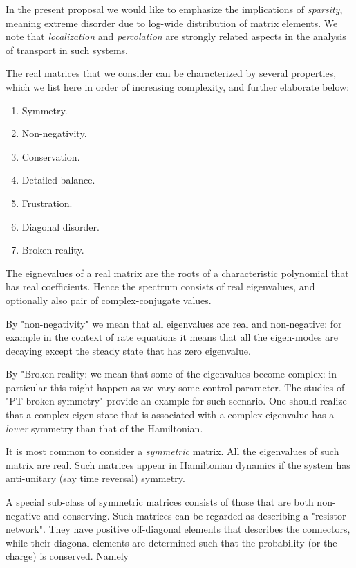 In the present proposal we would like to emphasize the 
implications of {\em sparsity}, meaning extreme disorder 
due to log-wide distribution of matrix elements. 
We note that {\em localization} and {\em percolation} are strongly 
related aspects in the analysis of transport in such systems. 


The real matrices that we consider can be characterized 
by several properties, which we list here in order of increasing 
complexity, and further elaborate below:

\begin{enumerate}
\item Symmetry.
\item Non-negativity.
\item Conservation.
\item Detailed balance.
\item Frustration.
\item Diagonal disorder.
\item Broken reality.
\end{enumerate}

The eignevalues of a real matrix are the roots of a characteristic 
polynomial that has real coefficients. Hence the spectrum consists 
of real eigenvalues, and optionally also pair of complex-conjugate 
values. 

By "non-negativity" we mean that all eigenvalues are real and 
non-negative: for example in the context of rate equations it means 
that all the eigen-modes are decaying except the steady state 
that has zero eigenvalue. 

By "Broken-reality: we mean that some of the eigenvalues  
become complex: in particular this might happen 
as we vary some control parameter. The studies of "PT broken symmetry" 
provide an example for such scenario. One should realize that  
a complex eigen-state that is associated with a complex eigenvalue 
has a {\em lower} symmetry than that of the Hamiltonian.

It is most common to consider a {\em symmetric} matrix. 
All the eigenvalues of such matrix are real. 
Such matrices appear in Hamiltonian dynamics 
if the system has anti-unitary (say time reversal) symmetry.  

A special sub-class of symmetric matrices consists of those 
that are both non-negative and conserving. Such matrices
can be regarded as describing a "resistor network".
They have positive off-diagonal elements that describes 
the connectors, while their diagonal elements are determined 
such that the probability (or the charge) is conserved. Namely 


